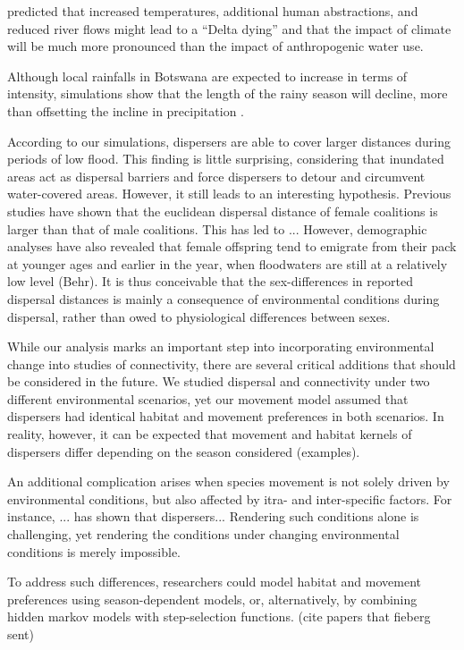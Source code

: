 \documentclass[abstract=on,10pt,a4paper,bibliography=totocnumbered]{article}
\begin{document}
\cite{MurrayHudson.2006} predicted that increased temperatures, additional human
abstractions, and reduced river flows might lead to a ``Delta dying'' and that
the impact of climate will be much more pronounced than the impact of
anthropogenic water use.

Although local rainfalls in Botswana are expected to increase in terms of
intensity, simulations show that the length of the rainy season will decline,
more than offsetting the incline in precipitation \cite{Akinyemi.2019}.

According to our simulations, dispersers are able to cover larger distances
during periods of low flood. This finding is little surprising, considering that
inundated areas act as dispersal barriers and force dispersers to detour and
circumvent water-covered areas. However, it still leads to an interesting
hypothesis. Previous studies have shown that the euclidean dispersal distance of
female coalitions is larger than that of male coalitions. This has led to ...
However, demographic analyses have also revealed that female offspring tend to
emigrate from their pack at younger ages and earlier in the year, when
floodwaters are still at a relatively low level (Behr). It is thus conceivable
that the sex-differences in reported dispersal distances is mainly a consequence
of environmental conditions during dispersal, rather than owed to physiological
differences between sexes.

While our analysis marks an important step into incorporating environmental
change into studies of connectivity, there are several critical additions that
should be considered in the future. We studied dispersal and connectivity under
two different environmental scenarios, yet our movement model assumed that
dispersers had identical habitat and movement preferences in both scenarios. In
reality, however, it can be expected that movement and habitat kernels of
dispersers differ depending on the season considered (examples).

An additional complication arises when species movement is not solely driven by
environmental conditions, but also affected by itra- and inter-specific factors.
For instance, ... has shown that dispersers...
Rendering such conditions alone is challenging, yet rendering the conditions
under changing environmental conditions is merely impossible.

To address such differences, researchers could model
habitat and movement preferences using season-dependent models, or,
alternatively, by combining hidden markov models with step-selection functions.
(cite papers that fieberg sent)
\end{document}
